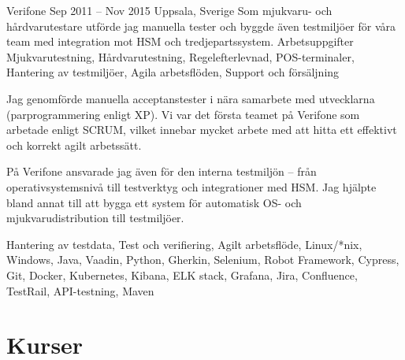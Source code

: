 \documentclass{sobCV}[2015/09/08]
\begin{document}
   {Verifone}
    {Sep 2011 -- Nov 2015}
   {Uppsala, Sverige}{
       Som mjukvaru- och hårdvarutestare utförde jag manuella tester och byggde även testmiljöer för våra team med integration mot HSM och tredjepartssystem.
   }
   {Arbetsuppgifter}{
       Mjukvarutestning,
       Hårdvarutestning,
       Regelefterlevnad, 
       POS-terminaler,
       Hantering av testmiljöer,
       Agila arbetsflöden,
       Support och försäljning
 }{
      {
          Jag genomförde manuella acceptanstester i nära samarbete med utvecklarna (parprogrammering enligt XP). Vi var det första teamet på Verifone som arbetade enligt SCRUM, vilket innebar mycket arbete med att hitta ett effektivt och korrekt agilt arbetssätt.

          På Verifone ansvarade jag även för den interna testmiljön – från operativsystemsnivå till testverktyg och integrationer med HSM. Jag hjälpte bland annat till att bygga ett system för automatisk OS- och mjukvarudistribution till testmiljöer.
     }
 }{
       Hantering av testdata,
       Test och verifiering,
       Agilt arbetsflöde, 
       Linux/*nix, 
       Windows, 
       Java, 
       Vaadin, 
       Python, 
       Gherkin, 
       Selenium, 
       Robot Framework,
       Cypress, 
       Git, 
       Docker, 
       Kubernetes, 
       Kibana, 
       ELK stack, 
       Grafana, 
       Jira, 
       Confluence, 
       TestRail, 
       API-testning, 
       Maven 
}

\section{Kurser}


\end{document}
